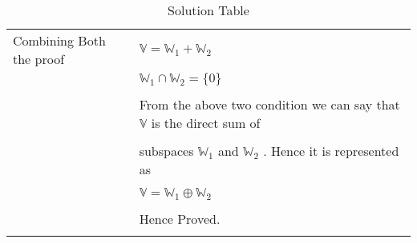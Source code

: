\begin{longtable}{|l|l|}
\hline
\multirow{3}{*}{Combining Both the proof} & \\
&$\mathbb{V}=\mathbb{W}_1+\mathbb{W}_2$\\
&\\
&$\mathbb{W}_1\cap\mathbb{W}_2=\{0\}$\\

\hline
&\\

&From  the above two condition we can say that $\mathbb{V}$ is the direct sum of \\
&\\
&subspaces $\mathbb{W}_1$ and $\mathbb{W}_2$ . Hence it is represented as\\
&\\
&$\mathbb{V}=\mathbb{W}_1\oplus\mathbb{W}_2$\\
&\\
&Hence Proved.\\
\hline
\caption{Solution Table}
\label{eq:solutions/6/6/1/table:2}
\end{longtable}
\twocolumn
